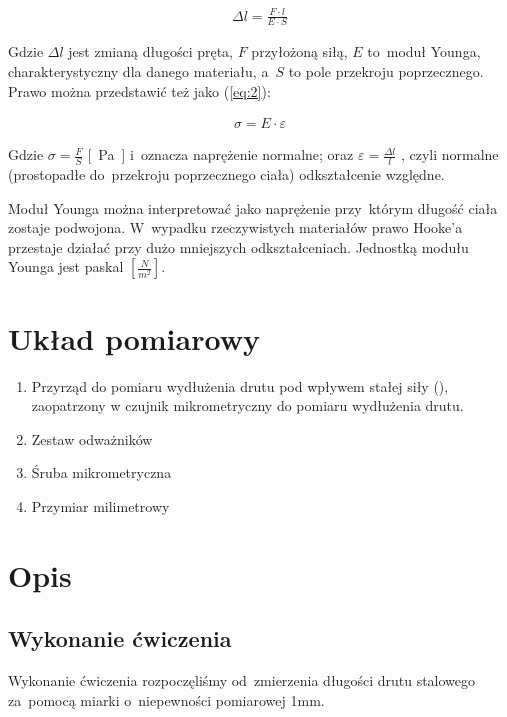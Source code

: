 \documentclass{fizraport}
\begin{document}
\begin{align}
    \Delta l = \frac{F \cdot l}{E \cdot S}
    \label{eq:1}
\end{align}

Gdzie $\Delta l$ jest zmianą długości pręta, $F$ przyłożoną siłą, $E$ to~moduł Younga,
charakterystyczny dla danego materiału, a~$S$ to pole przekroju poprzecznego. Prawo można
przedstawić też jako (\ref{eq:2}):

\begin{align}
    \sigma = E \cdot \varepsilon
    \label{eq:2}
\end{align}

Gdzie $ \sigma = \frac{F}{S}$ \si{[Pa]} i~oznacza naprężenie normalne; oraz $\varepsilon = \frac{\Delta l}{l} $ , czyli
normalne (prostopadłe do~przekroju poprzecznego ciała) odkształcenie względne.

Moduł Younga można interpretować jako naprężenie przy~którym długość ciała zostaje podwojona.
W~wypadku rzeczywistych materiałów prawo Hooke’a przestaje działać przy dużo mniejszych odkształceniach. Jednostką modułu Younga jest paskal $\si{[\frac{N}{m^2}]}$.


\section{Układ pomiarowy}
\begin{enumerate}
    \item Przyrząd do pomiaru wydłużenia drutu pod wpływem stałej siły (), zaopatrzony w czujnik mikrometryczny do pomiaru wydłużenia drutu.
    \item Zestaw odważników
    \item Śruba mikrometryczna
    \item Przymiar milimetrowy
\end{enumerate}

%
\pagebreak
\section{Opis}

\subsection{Wykonanie ćwiczenia}
Wykonanie ćwiczenia rozpoczęliśmy od~zmierzenia długości drutu stalowego za~pomocą miarki o~niepewności pomiarowej 1mm.
\end{document}
